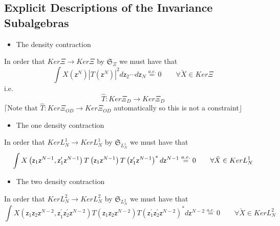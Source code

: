 \documentclass[aps,preprint]{revtex4}
\begin{document}
\subsection{Explicit Descriptions of the Invariance Subalgebras}

\begin{itemize}
\item The density contraction
\end{itemize}

In order that $Ker\Xi \rightarrow Ker\Xi $ by $\mathfrak{S}_{\Xi }$ we must
have that 
\begin{equation}
\int X\left( \mathsf{z}^{N}\right) \left\vert T\left( \mathsf{z}^{N}\right)
\right\vert ^{2}d\mathsf{z}_{2}\cdots d\mathsf{z}_{N}\overset{a.e.}{=}%
0\qquad \forall \breve{X}\in Ker\Xi
\end{equation}%
i.e. 
\begin{equation}
\hat{T}:Ker\Xi _{D}\rightarrow Ker\Xi _{D}
\end{equation}%
$\lceil $Note that $\hat{T}:Ker\Xi _{OD}\rightarrow Ker\Xi _{OD}$
automatically so this is not a constraint$\rfloor $

\begin{itemize}
\item The one density contraction
\end{itemize}

In order that $KerL_{N}^{1}\rightarrow KerL_{N}^{1}$ by $\mathfrak{S}%
_{L_{N}^{1}}$ we must have that%
\begin{equation}
\int X\left( \mathsf{z}_{1}\mathsf{z}^{N-1}\mathsf{,z}_{1}^{\prime }\mathsf{z%
}^{N-1}\right) T\left( \mathsf{z}_{1}\mathsf{z}^{N-1}\right) T\left( \mathsf{%
z}_{1}^{\prime }\mathsf{z}^{N-1}\right) ^{\ast }d\mathsf{z}^{N-1}\overset{%
a.e.}{=}0\qquad \forall \breve{X}\in KerL_{N}^{1}
\end{equation}

\begin{itemize}
\item The two density contraction
\end{itemize}

In order that $KerL_{N}^{2}\rightarrow KerL_{N}^{2}$ by $\mathfrak{S}%
_{L_{N}^{2}}$ we must have that%
\begin{equation}
\int X\left( \mathsf{z}_{1}\mathsf{z}_{2}\mathsf{z}^{N-2}\mathsf{,z}%
_{1}^{\prime }\mathsf{z}_{2}^{\prime }\mathsf{z}^{N-2}\right) T\left( 
\mathsf{z}_{1}\mathsf{z}_{2}\mathsf{z}^{N-2}\right) T\left( \mathsf{z}%
_{1}^{\prime }\mathsf{z}_{2}^{\prime }\mathsf{z}^{N-2}\right) ^{\ast }d%
\mathsf{z}^{N-2}\overset{a.e.}{=}0\qquad \forall \breve{X}\in KerL_{N}^{2}
\end{equation}
\end{document}
